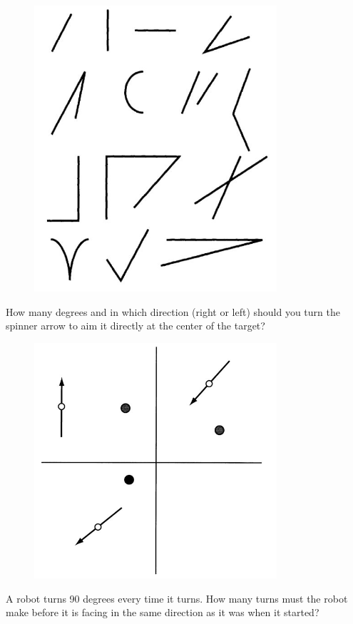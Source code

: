 \begin{questions}
\begin{figure}[H]
\centering
\includegraphics[width=90mm]{anglesTest.jpg}
\end{figure}

\question How many degrees and in which direction (right or left) should you turn the spinner arrow to aim it directly at the center of the target?

\begin{figure}[H]
\centering
\includegraphics[width=90mm]{turnTest.jpg}
\end{figure}

\question A robot turns 90 degrees every time it turns. How many turns must the robot make before it is facing in the same direction as it was when it started?


\end{questions}

